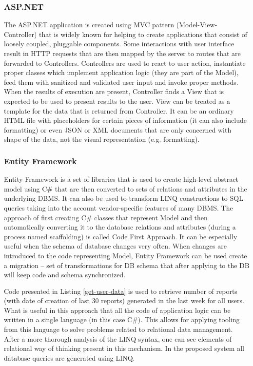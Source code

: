 \documentclass[12pt, twoside, openany]{report}
\theoremstyle{definition}
\begin{document}
\subsubsection{ASP.NET}
The ASP.NET application is created using MVC pattern (Model-View-Controller) that is widely known for helping to create applications that consist of loosely coupled, pluggable components. Some interactions with user interface result in HTTP requests that are then mapped by the server to routes that are forwarded to Controllers. Controllers are used to react to user action, instantiate proper classes which implement application logic (they are part of the Model), feed them with sanitized and validated user input and invoke proper methods. When the results of execution are present, Controller finds a View that is expected to be used to present results to the user. View can be treated as a template for the data that is returned from Controller. It can be an ordinary HTML file with placeholders for certain pieces of information (it can also include formatting) or even JSON or XML documents that are only concerned with shape of the data, not the visual representation (e.g. formatting).

\subsubsection{Entity Framework}
Entity Framework is a set of libraries that is used to create high-level abstract model using C\# that are then converted to sets of relations and attributes in the underlying DBMS. It can also be used to transform LINQ constructions to SQL queries taking into the account vendor-specific features of many DBMS.
The approach of first creating C\# classes that represent Model and then automatically converting it to the database relations and attributes (during a process named scaffolding) is called Code First Approach. It can be especially useful when the schema of database changes very often. When changes are introduced to the code representing Model, Entity Framework can be used create a migration -- set of transformations for DB schema that after applying to the DB will keep code and schema synchronized. 

Code presented in Listing \ref{get-user-data} is used to retrieve number of reports (with date of creation of last 30 reports) generated in the last week for all users. What is useful in this approach that all the code of application logic can be written in a single language (in this case C\#). This allows for applying tooling from this language to solve problems related to relational data management. After a more thorough analysis of the LINQ syntax, one can see elements of relational way of thinking present in this mechanism. In the proposed system all database queries are generated using LINQ.
\end{document}

